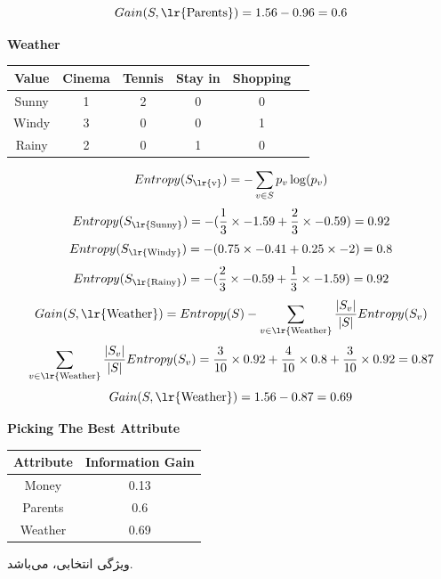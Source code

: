 \documentclass{article}
\newcommand{\tf}[1]{\text{\lr{#1}}}
\begin{document}
	\[
	Gain(S, \tf{Parents}) = 1.56 - 0.96 = 0.6
	\]
	\begin{latin}
		\textbf{Weather}
		\begin{center}
			\begin{tabular}{|c|c|c|c|c|c|}
				\hline
				Value & Cinema & Tennis & Stay in & Shopping\\
				\hline
				\hline
				Sunny & ‌1& 2 & 0 & 0\\
				\hline
				Windy & 3 & 0 & 0 & 1\\
				\hline
				Rainy & 2 & 0 & 1 & 0\\
				\hline
			\end{tabular}
		\end{center}
	\end{latin}
	\vspace{5pt}
	\[
	Entropy(S_{\tf{v}}) = -\sum_{v \in S} p_v\log (p_v)
	\]
	\[
	Entropy(S_{\tf{Sunny}}) = -(\frac{1}{3} \times -1.59 + \frac{2}{3} \times -0.59) = 0.92
	\]
	\[
	Entropy(S_{\tf{Windy}}) = -(0.75 \times -0.41 + 0.25 \times -2) = 0.8
	\]
	\[
	Entropy(S_{\tf{Rainy}}) = -(\frac{2}{3} \times -0.59 + \frac{1}{3} \times -1.59) = 0.92
	\]
	\vspace{10pt}
	\[
	Gain(S, \tf{Weather}) = Entropy(S) - \sum_{v \in \tf{Weather}} \frac{| S_v |}{| S |}Entropy(S_v)
	\] 
	\[
	\sum_{v \in \tf{Weather}} \frac{| S_v |}{| S |}Entropy(S_v) = \frac{3}{10} \times 0.92 + \frac{4}{10} \times 0.8 + \frac{3}{10} \times 0.92 = 0.87
	\]
	\[
	Gain(S, \tf{Weather}) = 1.56 - 0.87 = 0.69
	\]
	\newpage
	\begin{latin}
		\textbf{Picking The Best Attribute}
		\begin{center}
			\begin{tabular}{|c|c|}
				\hline
				Attribute & Information Gain\\
				\hline
				\hline
				Money & 0.13\\
				Parents & 0.6\\
				Weather & 0.69\\
				\hline
			\end{tabular}
		\end{center}
	\end{latin}
	ویژگی انتخابی،
	می‌باشد.
\end{document}
